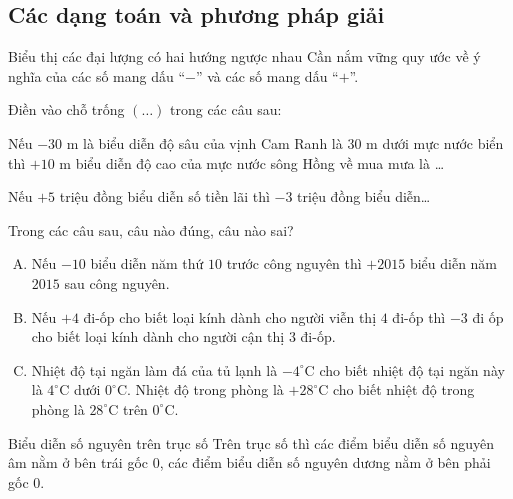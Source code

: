 \subsection{Các dạng toán và phương pháp giải}
\begin{dang}{Biểu thị các đại lượng có hai hướng ngược nhau}
Cần nắm vững quy ước về ý nghĩa của các số mang dấu ``$-$'' và các số mang dấu ``$+$''.
\end{dang}

\begin{vd}%
Điền vào chỗ trống $(\ldots)$ trong các câu sau:
\begin{enumEX}{1}
\item Nếu $-30$ m là biểu diễn độ sâu của vịnh Cam Ranh là $30$ m dưới mực nước biển thì $+10$ m biểu diễn độ cao của mực nước sông Hồng về mua mưa là \ldots
\item Nếu $+5$ triệu đồng biểu diễn số tiền lãi thì $-3$ triệu đồng biểu diễn\ldots
\end{enumEX}
\end{vd}

\begin{vd}%
Trong các câu sau, câu nào đúng, câu nào sai?
\begin{enumerate}[(A)]
\item Nếu $-10$ biểu diễn năm thứ $10$ trước công nguyên thì $+2015$ biểu diễn năm $2015$ sau công nguyên.
\item Nếu $+4$ đi-ốp cho biết loại kính dành cho người viễn thị $4$ đi-ốp thì $-3$ đi ốp cho biết loại kính dành cho người cận thị $3$ đi-ốp.
\item Nhiệt độ tại ngăn làm đá của tủ lạnh là $-4^\circ$C cho biết nhiệt độ tại ngăn này là $4^\circ$C dưới $0^\circ$C. Nhiệt độ trong phòng là $+28^\circ$C cho biết nhiệt độ trong phòng là $28^\circ$C trên $0^\circ$C.
\end{enumerate}
\end{vd}

\begin{dang}{Biểu diễn số nguyên trên trục số}
Trên trục số thì các điểm biểu diễn số nguyên âm nằm ở bên trái gốc $0$, các điểm biểu diễn số nguyên dương nằm ở bên phải gốc $0$.
\end{dang}

